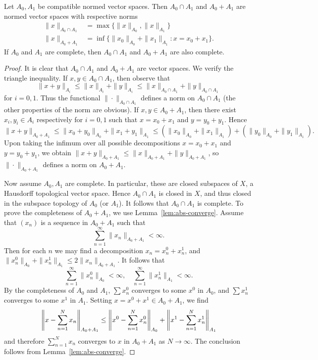 \begin{lemma}
\label{lem:compatible}
Let $A_0, A_1$ be compatible normed vector spaces. Then $A_0\cap A_1$ and $A_0+A_1$ are normed vector spaces with respective norms
\begin{align*}
    \|x\|_{A_0\cap A_1} &= \max\{ \|x\|_{A_0}, \|x\|_{A_1} \} \\
    \|x\|_{A_0+A_1} &= \inf\{ \|x_0\|_{A_0}+\|x_1\|_{A_1} : x=x_0+x_1 \}.
\end{align*}
If $A_0$ and $A_1$ are complete, then $A_0\cap A_1$ and $A_0+A_1$ are also complete.
\end{lemma}
\begin{proof}
It is clear that $A_0\cap A_1$ and $A_0+A_1$ are vector spaces. We verify the triangle inequality. If $x,y\in A_0\cap A_1$, then observe that
\begin{equation*}
    \|x+y\|_{A_i} \le \|x\|_{A_i} + \|y\|_{A_i} \le \|x\|_{A_0\cap A_1} + \|y\|_{A_0\cap A_1}
\end{equation*}
for $i=0,1$. Thus the functional $\|\cdot\|_{A_0\cap A_1}$ defines a norm on $A_0\cap A_1$ (the other properties of the norm are obvious). If $x,y\in A_0+A_1$, then there exist $x_i, y_i \in A_i$ respectively for $i=0,1$ such that $x=x_0+x_1$ and $y=y_0+y_1$. Hence
\begin{equation*}
    \|x+y\|_{A_0+A_1} \le \|x_0+y_0\|_{A_0} + \|x_1+y_1\|_{A_1} \le (\|x_0\|_{A_0}+\|x_1\|_{A_1}) + (\|y_0\|_{A_0}+\|y_1\|_{A_1}).
\end{equation*}
Upon taking the infimum over all possible decompositions $x=x_0+x_1$ and $y=y_0+y_1$, we obtain $\|x+y\|_{A_0+A_1}\le\|x\|_{A_0+A_1}+\|y\|_{A_0+A_1}$, so $\|\cdot\|_{A_0+A_1}$ defines a norm on $A_0+A_1$.

Now assume $A_0,A_1$ are complete. In particular, these are closed subspaces of $X$, a Hausdorff topological vector space. Hence $A_0\cap A_1$ is closed in $X$, and thus closed in the subspace topology of $A_0$ (or $A_1$). It follows that $A_0\cap A_1$ is complete. To prove the completeness of $A_0+A_1$, we use Lemma~\ref{lem:abs-converge}. Assume that $(x_n)$ is a sequence in $A_0+A_1$ such that
\begin{equation*}
    \sum_{n=1}^\infty \|x_n\|_{A_0+A_1} < \infty.
\end{equation*}
Then for each $n$ we may find a decomposition $x_n=x_n^0+x_n^1$, and $\|x_n^0\|_{A_0}+\|x_n^1\|_{A_1} \le 2\|x_n\|_{A_0+A_1}$. It follows that
\begin{equation*}
    \sum_{n=1}^\infty \|x_n^0\|_{A_0} < \infty, \quad \sum_{n=1}^\infty \|x_n^1\|_{A_1} < \infty.
\end{equation*}
By the completeness of $A_0$ and $A_1$, $\sum x_n^0$ converges to some $x^0$ in $A_0$, and $\sum x_n^1$ converges to some $x^1$ in $A_1$. Setting $x=x^0+x^1 \in A_0+A_1$, we find
\begin{equation*}
    \left\lVert x-\sum_{n=1}^N x_n \right\rVert_{A_0+A_1} \le \left\lVert x^0-\sum_{n=1}^N x_n^0 \right\rVert_{A_0} + \left\lVert x^1-\sum_{n=1}^N x_n^1 \right\rVert_{A_1}
\end{equation*}
and therefore $\sum_{n=1}^N x_n$ converges to $x$ in $A_0+A_1$ as $N\to\infty$. The conclusion follows from Lemma~\ref{lem:abs-converge}.
\end{proof}

